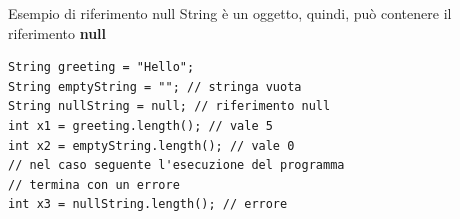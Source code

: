 \begin{frame}[fragile]
\begin{block}{Esempio di riferimento null}
String è un oggetto, quindi, può contenere il riferimento \textbf{null}
\end{block}
\begin{lstlisting}
String greeting = "Hello";
String emptyString = ""; // stringa vuota 
String nullString = null; // riferimento null 
int x1 = greeting.length(); // vale 5
int x2 = emptyString.length(); // vale 0
// nel caso seguente l'esecuzione del programma
// termina con un errore
int x3 = nullString.length(); // errore
\end{lstlisting}
\end{frame}